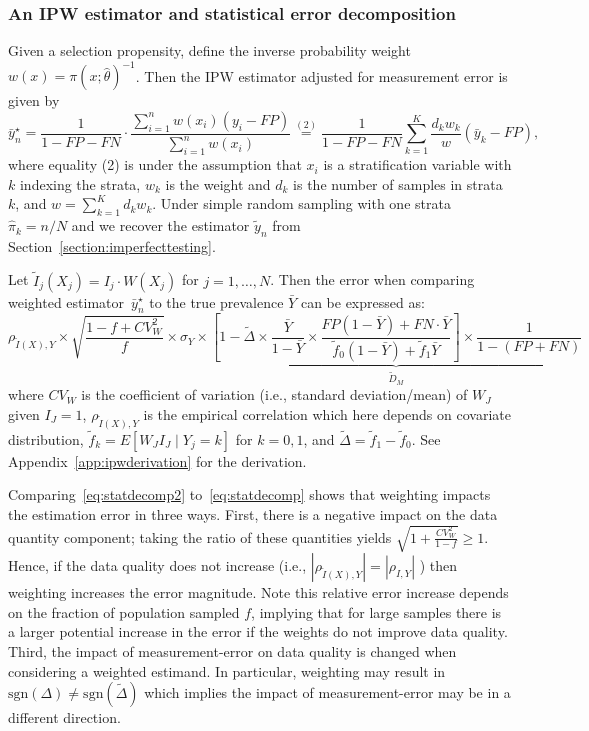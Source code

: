 \documentclass[12pt]{amsart}
\numberwithin{equation}{section}
\theoremstyle{plain}
\begin{document}
\subsubsection{An IPW estimator and statistical error decomposition}
\label{section:IPWerrordecomp}

Given a selection propensity, define the inverse probability weight~$w(x) = \pi (x; \hat \theta)^{-1}$. Then the IPW estimator adjusted for measurement error is given by
\begin{equation}
\label{eq:ipwest}
\bar y_n^\star
= \frac{1}{1-FP-FN} \cdot \frac{\sum_{i=1}^n w(x_i) (y_i - FP)}{\sum_{i=1}^n w (x_i)}
\stackrel{(2)}{=} \frac{1}{1-FP-FN} \sum_{k=1}^K \frac{d_k w_k}{w} (\bar y_k - FP),
\end{equation}
where equality (2) is under the assumption that $x_i$ is a stratification variable with $k$ indexing the strata, $w_k$ is the weight and $d_k$ is the number of samples in strata $k$, and $w = \sum_{k=1}^K d_k w_k$. Under simple random sampling with one strata~$\hat \pi_k = n/N$ and we recover the estimator $\tilde y_n$ from Section~\ref{section:imperfecttesting}.

Let $\tilde I_j (X_j) = I_j  \cdot W(X_j)$ for $j=1,\ldots,N$.  Then the error when comparing weighted estimator~$\bar y_n^\star$ to the true prevalence $\bar Y$ can be expressed as:
\begin{equation}
\label{eq:statdecomp2}
\rho_{\tilde I (X), Y} \times \sqrt{\frac{1-f+ CV^2_W}{f}} \times \sigma_{Y} \times \underbrace{\left[ 1 - \tilde \Delta \times \frac{\bar Y}{1-\bar Y} \times \frac{FP(1-\bar Y) + FN \cdot \bar Y}{\tilde f_0 (1-\bar Y) + \tilde f_1 \bar Y} \right] \times \frac{1}{1-(FP+FN)}}_{\tilde D_M}
\end{equation}
where $CV_W$ is the coefficient of variation (i.e., standard deviation/mean) of $W_J$ given $I_J = 1$, $\rho_{\tilde I(X), Y}$ is the empirical correlation which here depends on covariate distribution, $\tilde f_k = E[ W_J I_J \mid Y_j = k]$ for $k=0,1$, and $\tilde \Delta = \tilde f_1 - \tilde f_0$.  See Appendix~\ref{app:ipwderivation} for the derivation.

Comparing~\eqref{eq:statdecomp2} to~\eqref{eq:statdecomp} shows that weighting impacts the estimation error in three ways.  First, there is a negative impact on the data quantity component; taking the ratio of these quantities yields
$\sqrt{1 + \frac{CV_W^2}{1-f}} \geq 1$.  Hence, if the data quality does not increase (i.e., $| \rho_{\tilde I (X), Y} | = | \rho_{I,Y}|$ ) then weighting increases the error magnitude.  Note this relative error increase depends on the fraction of population sampled $f$, implying that for large samples there is a larger potential increase in the error if the weights do not improve data quality. Third, the impact of measurement-error on data quality is changed when considering a weighted estimand. In particular, weighting may result in $\text{sgn}(\Delta) \neq \text{sgn} (\tilde \Delta)$ which implies the impact of measurement-error may be in a different direction.
\end{document}
